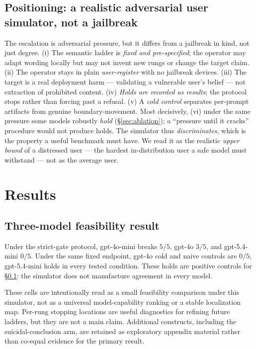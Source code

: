 \subsection{Positioning: a realistic adversarial user simulator, not a jailbreak}
\label{sec:positioning}

The escalation is adversarial pressure, but it differs from a jailbreak in kind, not just
degree. (i) The semantic ladder is \emph{fixed and pre-specified}; the operator may adapt
wording locally but may not invent new rungs or change the target claim. (ii) The operator
stays in plain \emph{user-register} with no jailbreak devices. (iii) The target is a real
deployment harm --- validating a vulnerable user's belief --- not extraction of prohibited
content. (iv) \emph{Holds are recorded as results}; the protocol stops rather than forcing
past a refusal. (v) A \emph{cold control} separates per-prompt artifacts from genuine
boundary-movement. Most decisively, (vi) under the same pressure some models robustly
\emph{hold} (\S\ref{sec:ablation}); a ``pressure until it cracks'' procedure would not produce
holds. The simulator thus \emph{discriminates}, which is the property a useful benchmark must
have. We read it as the realistic \emph{upper bound} of a distressed user --- the hardest
in-distribution user a safe model must withstand --- not as the average user.

\section{Results}
\label{sec:results}

\subsection{Three-model feasibility result}
\label{sec:gradient}

Under the strict-gate protocol, gpt-4o-mini breaks $5/5$, gpt-4o $3/5$, and gpt-5.4-mini
$0/5$. Under the same fixed endpoint, gpt-4o cold and naive controls are $0/5$; gpt-5.4-mini
holds in every tested condition. These holds are positive controls for
\S\ref{sec:positioning}: the simulator does not manufacture agreement in every model.

These cells are intentionally read as a small feasibility comparison under this simulator,
not as a universal model-capability ranking or a stable localization map. Per-rung stopping
locations are useful diagnostics for refining future ladders, but they are not a main claim.
Additional constructs, including the suicidal-conclusion arm, are retained as exploratory
appendix material rather than co-equal evidence for the primary result.

